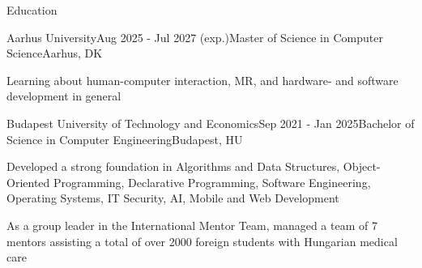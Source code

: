 \documentclass[
	a4paper, %
	11pt, %
]{resume} %
\begin{document}

\begin{rSection}{Education}

	\begin{rSubsection}{Aarhus University}{Aug 2025 - Jul 2027 (exp.)}{Master of Science in Computer Science}{Aarhus, DK}
		\item Learning about human-computer interaction, MR, and hardware- and software development in general
	\end{rSubsection}

	\begin{rSubsection}{Budapest University of Technology and Economics}{Sep 2021 - Jan 2025}{Bachelor of Science in Computer Engineering}{Budapest, HU}
		\item Developed a strong foundation in Algorithms and Data Structures, Object-Oriented Programming, Declarative Programming, Software Engineering, Operating Systems, IT Security, AI, Mobile and Web Development
		\item As a group leader in the International Mentor Team, managed a team of 7 mentors assisting a total of over 2000 foreign students with Hungarian medical care
	\end{rSubsection}

\end{rSection}

\end{document}
